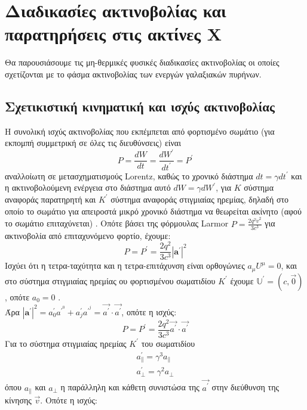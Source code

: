 \chapter{Διαδικασίες ακτινοβολίας και παρατηρήσεις στις ακτίνες Χ} 

Θα παρουσιάσουμε τις μη-θερμικές φυσικές διαδικασίες ακτινοβολίας οι οποίες σχετίζονται με το φάσμα ακτινοβολίας των ενεργών γαλαξιακών πυρήνων.

\section{Σχετικιστική κινηματική και ισχύς ακτινοβολίας}

Η συνολική ισχύς ακτινοβολίας που εκπέμπεται από φορτισμένο σωμάτιο (για εκπομπή συμμετρική σε όλες τις διευθύνσεις) είναι $$P = \dfrac{dW}{dt} = \dfrac{dW^\prime}{dt^\prime}=P^\prime$$
αναλλοίωτη σε μετασχηματισμούς \textlatin{Lorentz}, καθώς το χρονικό διάστημα $dt=\gamma dt^\prime$ και η ακτινοβολούμενη ενέργεια στο διάστημα αυτό $dW= \gamma dW^\prime$, για $Κ$ σύστημα αναφοράς παρατηρητή και $Κ^\prime$ σύστημα αναφοράς στιγμιαίας ηρεμίας, δηλαδή στο οποίο το σωμάτιο για απειροστά μικρό χρονικό διάστημα να θεωρείται ακίνητο (αφού το σωμάτιο επιταχύνεται) \cite{1986rpa..book.....R}.
Οπότε βάσει της φόρμουλας \textlatin{Larmor}  $ P= \frac{2q^2 \dot{v}^2}{3c^3} $ για ακτινοβολία από επιταχυνόμενο φορτίο, έχουμε: $$ P=P^\prime =  \frac{2q^2 }{3c^3} |\mathbf{a^\prime}|^2$$
Ισχύει ότι η τετρα-ταχύτητα και η τετρα-επιτάχυνση είναι ορθογώνιες $a_\mu U^\mu = 0 $, και στο σύστημα στιγμιαίας ηρεμίας ου φορτισμένου σωματιδίου $Κ^\prime$ έχουμε $ \mathbb{U^\prime}= (c,  \vec{0})$, οπότε  $a_0 = 0$ . \\
Άρα $ |\mathbf{a^\prime}|^2 = a^\prime_0a^\prime^0 + a^\prime_ja^\prime^j=  \vec{a^\prime}\cdot \vec{a^\prime}   $, οπότε η ισχύς\cite{1986rpa..book.....R}:
$$ P=P^\prime =  \frac{2q^2 }{3c^3}  \vec{a^\prime}\cdot \vec{a^\prime} $$
Για το σύστημα στιγμιαίας ηρεμίας $K^\prime$ του σωματιδίου 
\begin{subequations}
\label{eq:PowerComp}
\begin{align}
a^\prime_{\parallel }  = \gamma^3 a_{\parallel }   \label{eq:PowerCompA} \\ 
a^\prime_{\bot }  = \gamma^2 a_{\bot }   \label{eq:PowerCompB} 
\end{align}
\end{subequations}
όπου $ a_{\parallel }$ και $a_{\bot }$ η παράλληλη και κάθετη συνιστώσα της $\vec{a^\prime}$ στην διεύθυνση της κίνησης $\vec{v}$. Οπότε η ισχύς\cite{1986rpa..book.....R}:
